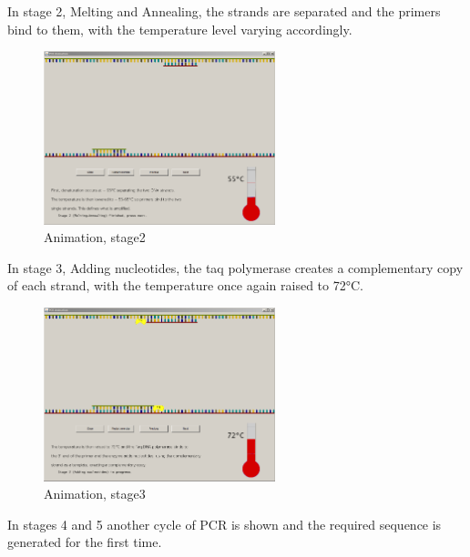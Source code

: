 In stage 2, Melting and Annealing, the strands are separated and the primers bind to them, with the temperature level varying accordingly.

\begin{figure}[h]
  \begin{center}
	\includegraphics[width=0.6\textwidth]{./images/AnimImpl/Stage2.png}
    \caption{
      \label{fig:AnimImpl:stage2}
      Animation, stage2
    }
  \end{center}
\end{figure}

In stage 3, Adding nucleotides, the taq polymerase creates a complementary copy of each strand, with the temperature once again raised to 72°C.

\begin{figure}[h]
  \begin{center}
	\includegraphics[width=0.6\textwidth]{./images/AnimImpl/Stage3.png}
    \caption{
      \label{fig:AnimImpl:stage3}
      Animation, stage3
    }
  \end{center}
\end{figure}

In stages 4 and 5 another cycle of PCR is shown and the required sequence is generated for the first time.

